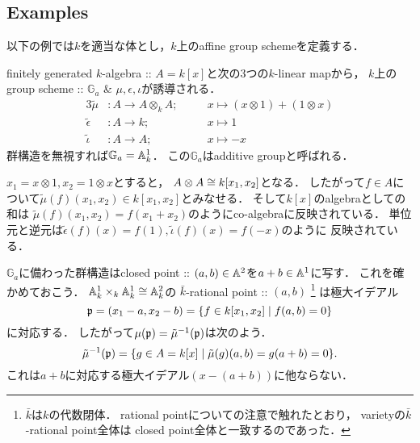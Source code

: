 \documentclass[a4paper]{jsarticle}
\newcommand{\Ga}{\mathbb{G}_a}
\begin{document}
    \subsection{Examples}
    以下の例では$k$を適当な体とし，$k$上のaffine group schemeを定義する．
    \begin{Example}[$\Ga$]
        finitely generated $k$-algebra :: $A=k[x]$と次の3つの$k$-linear mapから，
        $k$上のgroup scheme :: $\Ga$ \& $\mu,\epsilon,\iota$が誘導される．
        \begin{alignat*}{3}
            \tilde{\mu}&:
                A \to A \otimes_k A; &&
                \quad x \mapsto (x \otimes 1)+(1 \otimes x) \\
            \tilde{\epsilon}&:
                A \to k; &&
                \quad x \mapsto 1 \\
            \tilde{\iota}&:
                A \to A; &&
                \quad x \mapsto -x
        \end{alignat*}
        群構造を無視すれば$\Ga=\affine^1_k$．
        この$\Ga$はadditive groupと呼ばれる．

        $x_1=x \otimes 1, x_2=1 \otimes x$とすると，
        $A \otimes A \cong k[x_1,x_2]$となる．
        したがって$f \in A$について$\tilde{\mu}(f)(x_1,x_2) \in k[x_1,x_2]$とみなせる．
        そして$k[x]$のalgebraとしての和は
        $\tilde{\mu}(f)(x_1,x_2)=f(x_1+x_2)$のようにco-algebraに反映されている．
        単位元と逆元は$\tilde{\epsilon}(f)(x)=f(1), \tilde{\iota}(f)(x)=f(-x)$のように
        反映されている．
    
        $\Ga$に備わった群構造はclosed point :: $(a,b) \in \mathbb{A}^2$を$a+b \in \mathbb{A}^1$に写す．
        これを確かめておこう．
        $\mathbb{A}^1_k \times_k \mathbb{A}^1_k \cong \mathbb{A}^2_k$の
        $\bar{k}$-rational point :: $(a,b)$
        \footnote
        {
            $\bar{k}$は$k$の代数閉体．
            rational pointについての注意で触れたとおり，
            varietyの$\bar{k}$-rational point全体は
            closed point全体と一致するのであった．
        }
        は極大イデアル
        \[ \mathfrak{p}=(x_1-a, x_2-b)=\{ f \in k[x_1,x_2] \mid f(a,b)=0 \} \]に対応する．
        したがって$\mu(\mathfrak{p})=\tilde{\mu}^{-1}(\mathfrak{p})$は次のよう．
        \[ \tilde{\mu}^{-1}(\mathfrak{p})=\{ g \in A=k[x] \mid \tilde{\mu}(g)(a,b)=g(a+b)=0 \}. \]
        これは$a+b$に対応する極大イデアル$(x-(a+b))$に他ならない．
    \end{Example}
\end{document}
